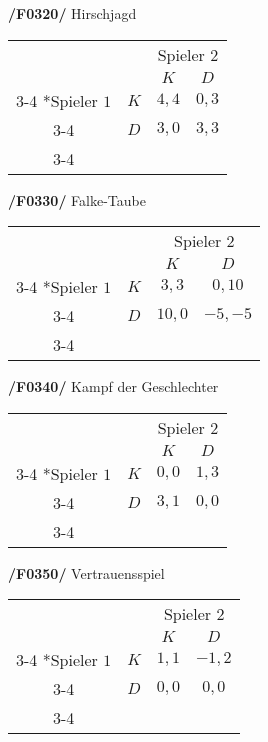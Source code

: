 \textbf{/F0320/} 
Hirschjagd
\begin{table}[H]
\centering
\setlength{\extrarowheight}{2pt}
\begin{tabular}{cc|c|c|}
  & \multicolumn{1}{c}{} & \multicolumn{2}{c}{Spieler $2$} \\
  & \multicolumn{1}{c}{} & \multicolumn{1}{c}{$K$} & \multicolumn{1}{c}{$D$} \\\cline{3-4}
  \multirow{2}*{Spieler $1$} & $K$ & $4,4$ & $0,3$ \\\cline{3-4} 
  & $D$ & $3,0$ & $3,3$ \\\cline{3-4}
\end{tabular}
\end{table}

\textbf{/F0330/} 
Falke-Taube
\begin{table}[H]
\centering
\setlength{\extrarowheight}{2pt}
\begin{tabular}{cc|c|c|}
  & \multicolumn{1}{c}{} & \multicolumn{2}{c}{Spieler $2$} \\
  & \multicolumn{1}{c}{} & \multicolumn{1}{c}{$K$} & \multicolumn{1}{c}{$D$} \\\cline{3-4}
  \multirow{2}*{Spieler $1$} & $K$ & $3,3$ & $0,10$ \\\cline{3-4} 
  & $D$ & $10,0$ & $-5,-5$ \\\cline{3-4}
\end{tabular}
\end{table}

\textbf{/F0340/} 
Kampf der Geschlechter
\begin{table}[H]
\centering
\setlength{\extrarowheight}{2pt}
\begin{tabular}{cc|c|c|}
  & \multicolumn{1}{c}{} & \multicolumn{2}{c}{Spieler $2$} \\
  & \multicolumn{1}{c}{} & \multicolumn{1}{c}{$K$} & \multicolumn{1}{c}{$D$} \\\cline{3-4}
  \multirow{2}*{Spieler $1$} & $K$ & $0,0$ & $1,3$ \\\cline{3-4} 
  & $D$ & $3,1$ & $0,0$ \\\cline{3-4}
\end{tabular}
\end{table}

\textbf{/F0350/} 
Vertrauensspiel
\begin{table}[H]
\centering
\setlength{\extrarowheight}{2pt}
\begin{tabular}{cc|c|c|}
  & \multicolumn{1}{c}{} & \multicolumn{2}{c}{Spieler $2$} \\
  & \multicolumn{1}{c}{} & \multicolumn{1}{c}{$K$} & \multicolumn{1}{c}{$D$} \\\cline{3-4}
  \multirow{2}*{Spieler $1$} & $K$ & $1,1$ & $-1,2$ \\\cline{3-4} 
  & $D$ & $0,0$ & $0,0$ \\\cline{3-4}
\end{tabular}
\end{table}

